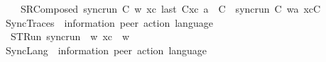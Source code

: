 \begin{isabellebody}
\ \ \ \ SRComposed{\isacharcolon}{\kern0pt}\ {\isachardoublequoteopen}{\isasymlbrakk}sync{\isacharunderscore}{\kern0pt}run\ C{}\ w\ xc{\isacharsemicolon}{\kern0pt}\ last\ {\isacharparenleft}{\kern0pt}C{}{\isacharhash}{\kern0pt}xc{\isacharparenright}{\kern0pt}\ {\isasymmidarrow}{\isasymlangle}a{\isacharcomma}{\kern0pt}\ {\isasymzero}{\isasymrangle}{\isasymrightarrow}\ C{\isasymrbrakk}\ {\isasymLongrightarrow}\ sync{\isacharunderscore}{\kern0pt}run\ C{}\ {\isacharparenleft}{\kern0pt}w{\isasymsqdot}{\isacharbrackleft}{\kern0pt}a{\isacharbrackright}{\kern0pt}{\isacharparenright}{\kern0pt}\ {\isacharparenleft}{\kern0pt}xc{\isacharat}{\kern0pt}{\isacharbrackleft}{\kern0pt}C{\isacharbrackright}{\kern0pt}{\isacharparenright}{\kern0pt}{\isachardoublequoteclose}\isanewline
\isanewline
%
\isanewline
{}\isamarkupfalse%
\ SyncTraces\ {\isacharcolon}{\kern0pt}{\isacharcolon}{\kern0pt}\ {\isachardoublequoteopen}{\isacharparenleft}{\kern0pt}{\isacharprime}{\kern0pt}information{\isacharcomma}{\kern0pt}\ {\isacharprime}{\kern0pt}peer{\isacharparenright}{\kern0pt}\ action\ language{\isachardoublequoteclose}\ \ {\isacharparenleft}{\kern0pt}{\isachardoublequoteopen}{\isasymT}\isactrlsub {\isasymzero}{\isachardoublequoteclose}\ {}{}{}{\isacharparenright}{\kern0pt}\ \isanewline
\ \ STRun{\isacharcolon}{\kern0pt}\ {\isachardoublequoteopen}sync{\isacharunderscore}{\kern0pt}run\ {\isasymC}\isactrlsub {\isasymI}\isactrlsub {\isasymzero}\ w\ xc\ {\isasymLongrightarrow}\ w\ {\isasymin}\ {\isasymT}\isactrlsub {\isasymzero}{\isachardoublequoteclose}\isanewline
\isanewline
%
\isanewline
{}\isamarkupfalse%
\ SyncLang\ {\isacharcolon}{\kern0pt}{\isacharcolon}{\kern0pt}\ {\isachardoublequoteopen}{\isacharparenleft}{\kern0pt}{\isacharprime}{\kern0pt}information{\isacharcomma}{\kern0pt}\ {\isacharprime}{\kern0pt}peer{\isacharparenright}{\kern0pt}\ action\ language{\isachardoublequoteclose}\ \ {\isacharparenleft}{\kern0pt}{\isachardoublequoteopen}{\isasymL}\isactrlsub {\isasymzero}{\isachardoublequoteclose}\ {}{}{}{\isacharparenright}{\kern0pt}\ \isanewline
\ \ {\isachardoublequoteopen}{\isasymL}\isactrlsub {\isasymzero}\ {\isasymequiv}\ {\isasymT}\isactrlsub {\isasymzero}{\isachardoublequoteclose}%
\isadelimdocument
%
\endisadelimdocument
%
\isatagdocument
%
\isamarkuptrue%
%

\end{isabellebody}
